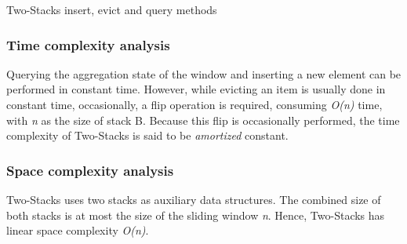 \begin{algorithm}
    \caption{Two-Stacks insert, evict and query methods}
    \label{pseudo:2-stacks}
    \begin{algorithmic}[1]
            \State \Return{$\overline{\theta}$} 
        \Else 
            \State {} 
        \EndIf
        \EndFunction
        
            \State {}
        \EndFunction
        
        
        \EndFunction
        
        
        
             
                \EndWhile
            \EndIf
        \EndFunction
    \end{algorithmic}
\end{algorithm}

\subsubsection*{Time complexity analysis}
Querying the aggregation state of the window and inserting a new element can be performed in constant time. However, while evicting an item is usually done in constant time, occasionally, a flip operation is required, consuming \textit{O(n)} time, with \textit{n} as the size of stack B. Because this flip is occasionally performed, the time complexity of Two-Stacks is said to be \textit{amortized} constant.

\subsubsection*{Space complexity analysis}
Two-Stacks uses two stacks as auxiliary data structures. The combined size of both stacks is at most the size of the sliding window \textit{n}. Hence, Two-Stacks has linear space complexity \textit{O(n)}.


